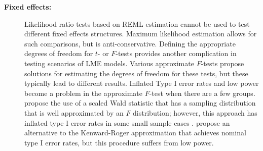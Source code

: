 \documentclass[12pt]{article} %
\begin{document}
\begin{description}
\item[\bf Fixed effects: ] Likelihood ratio tests based on REML estimation cannot be used to test different fixed effects structures. Maximum likelihood estimation allows for such comparisons, but is anti-conservative. 
Defining the appropriate degrees of freedom for  $t$- or $F$-tests provides another  complication in testing scenarios of LME models. Various approximate $F$-tests \citep{Verbeke:2000fh} propose solutions for estimating the degrees of freedom for these tests, but these typically lead to different results. Inflated Type I error rates and low power \citep{Catellier:2000vr}  become a problem  in the  approximate $F$-test when there are a few groups. \cite{Kenward:1997ft} propose the use of a scaled Wald statistic  that has a sampling distribution that is well approximated by an $F$ distribution; however, this approach has inflated type I error rates in some small sample cases  \citep{Gomez:2005dw}. \cite{Skene:2010kf} propose an alternative to the Kenward-Roger approximation that achieves nominal type I error rates, but this procedure suffers from low power. 
%
%
%



\end{description}
\end{document}
